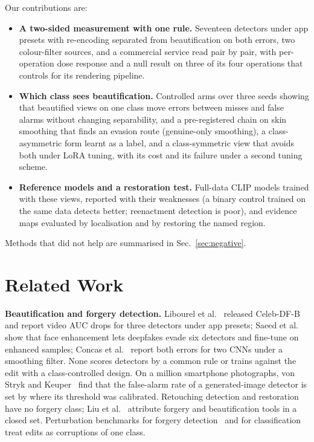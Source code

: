 \documentclass[conference]{IEEEtran}
\begin{document}
Our contributions are:
\begin{itemize}
\item \textbf{A two-sided measurement with one rule.} Seventeen detectors under app presets with re-encoding separated from
beautification on both errors, two colour-filter sources, and a commercial service read pair by pair, with per-operation
dose response and a null result on three of its four operations that controls for its rendering pipeline.
\item \textbf{Which class sees beautification.} Controlled arms over three seeds showing that beautified views on one class
move errors between misses and false alarms without changing separability, and a pre-registered chain on skin smoothing that
finds an evasion route (genuine-only smoothing), a class-asymmetric form learnt as a label, and a class-symmetric view that
avoids both under LoRA tuning, with its cost and its failure under a second tuning scheme.
\item \textbf{Reference models and a restoration test.} Full-data CLIP models trained with these views, reported with their
weaknesses (a binary control trained on the same data detects better; reenactment detection is poor), and evidence maps
evaluated by localisation and by restoring the named region.
\end{itemize}
Methods that did not help are summarised in Sec.~\ref{sec:negative}.

\section{Related Work}
\textbf{Beautification and forgery detection.} Libourel et al.~\cite{libourel2024} released Celeb-DF-B and report video AUC
drops for three detectors under app presets; Saeed et al.~\cite{saeed2025} show that face enhancement lets deepfakes evade six
detectors and fine-tune on enhanced samples; Concas et al.~\cite{concas2025} report both errors for two CNNs under a smoothing
filter. None scores detectors by a common rule or trains against the edit with a class-controlled design. On a million
smartphone photographs, von Stryk and Keuper~\cite{laionmobile2026} find that the false-alarm rate of a generated-image detector
is set by where its threshold was calibrated. Retouching detection and restoration~\cite{bharati2016,jain2018,wang2019photoshop,
retouchingffhq,frrffusion,mofrr,reface} have no forgery class; Liu et al.~\cite{miea2026} attribute forgery and beautification
tools in a closed set. Perturbation benchmarks for forgery detection~\cite{deeperforensics2020,moire2025} and for
classification~\cite{hendrycks2019} treat edits as corruptions of one class.
\end{document}
